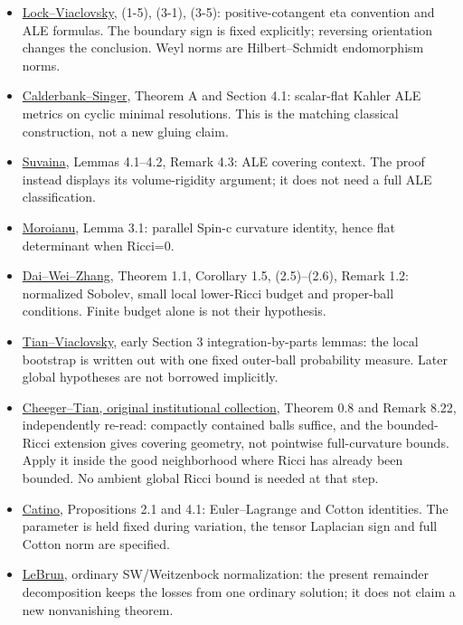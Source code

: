 \documentclass[
  10pt,
]{article}
\providecommand{\tightlist}{%
  \setlength{\itemsep}{0pt}\setlength{\parskip}{0pt}}
\begin{document}
\begin{itemize}
\tightlist
\item
  \href{https://msp.org/gt/2016/20-3/gt-v20-n3-p13-s.pdf}{Lock--Viaclovsky},
  (1-5), (3-1), (3-5): positive-cotangent eta convention and ALE
  formulas. The boundary sign is fixed explicitly; reversing orientation
  changes the conclusion. Weyl norms are Hilbert--Schmidt endomorphism
  norms.
\item
  \href{https://arxiv.org/pdf/math/0206229}{Calderbank--Singer}, Theorem
  A and Section 4.1: scalar-flat Kahler ALE metrics on cyclic minimal
  resolutions. This is the matching classical construction, not a new
  gluing claim.
\item
  \href{https://arxiv.org/pdf/1102.2672}{Suvaina}, Lemmas 4.1--4.2,
  Remark 4.3: ALE covering context. The proof instead displays its
  volume-rigidity argument; it does not need a full ALE classification.
\item
  \href{https://moroianu.perso.math.cnrs.fr/tex/1997cmp.pdf}{Moroianu},
  Lemma 3.1: parallel Spin-c curvature identity, hence flat determinant
  when Ricci=0.
\item
  \href{https://web.math.ucsb.edu/~wei/paper/Dai-Wei-Zhang.pdf}{Dai--Wei--Zhang},
  Theorem 1.1, Corollary 1.5, (2.5)--(2.6), Remark 1.2: normalized
  Sobolev, small local lower-Ricci budget and proper-ball conditions.
  Finite budget alone is not their hypothesis.
\item
  \href{https://arxiv.org/pdf/math/0310302}{Tian--Viaclovsky}, early
  Section 3 integration-by-parts lemmas: the local bootstrap is written
  out with one fixed outer-ball probability measure. Later global
  hypotheses are not borrowed implicitly.
\item
  \href{https://www.math.stonybrook.edu/Courses/MAT683/201001/MAT683S10.pdf}{Cheeger--Tian,
  original institutional collection}, Theorem 0.8 and Remark 8.22,
  independently re-read: compactly contained balls suffice, and the
  bounded-Ricci extension gives covering geometry, not pointwise
  full-curvature bounds. Apply it inside the good neighborhood where
  Ricci has already been bounded. No ambient global Ricci bound is
  needed at that step.
\item
  \href{https://arxiv.org/abs/1404.0569}{Catino}, Propositions 2.1 and
  4.1: Euler--Lagrange and Cotton identities. The parameter is held
  fixed during variation, the tensor Laplacian sign and full Cotton norm
  are specified.
\item
  \href{https://arxiv.org/pdf/math/0003068}{LeBrun}, ordinary
  SW/Weitzenbock normalization: the present remainder decomposition
  keeps the losses from one ordinary solution; it does not claim a new
  nonvanishing theorem.
\end{itemize}
\end{document}
